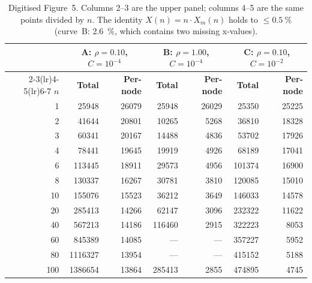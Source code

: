 \documentclass[11pt,a4paper]{article}
\newcommand{\hot}{C}
\newcommand{\tput}{\ensuremath{X}}
\newcommand{\pernode}{X_m}
\begin{document}
\begin{table}[H]
\centering
\caption{Digitised Figure~5. Columns 2--3 are the upper panel; columns 4--5 are
the same points divided by $n$. The identity $\tput(n) = n\cdot\pernode(n)$
holds to $\le\SI{0.5}{\percent}$ (curve~B: \SI{2.6}{\percent}, which contains
two missing x-values).}
\label{tab:fig5}
\begin{tabular}{@{}rrrrrrr@{}}
\toprule
& \multicolumn{2}{c}{\textbf{A: $\rho{=}0.10$, $\hot{=}10^{-4}$}}
& \multicolumn{2}{c}{\textbf{B: $\rho{=}1.00$, $\hot{=}10^{-4}$}}
& \multicolumn{2}{c}{\textbf{C: $\rho{=}0.10$, $\hot{=}10^{-2}$}} \\
\cmidrule(lr){2-3}\cmidrule(lr){4-5}\cmidrule(lr){6-7}
\textbf{$n$} & \textbf{Total} & \textbf{Per-node} & \textbf{Total} &
\textbf{Per-node} & \textbf{Total} & \textbf{Per-node} \\
\midrule
  1 & \num{25948} & \num{26079} & \num{25948} & \num{26029} & \num{25350} & \num{25225} \\
  2 & \num{41644} & \num{20801} & \num{10265} & \num{5268}  & \num{36810} & \num{18328} \\
  3 & \num{60341} & \num{20167} & \num{14488} & \num{4836}  & \num{53702} & \num{17926} \\
  4 & \num{78441} & \num{19645} & \num{19919} & \num{4926}  & \num{68189} & \num{17041} \\
  6 & \num{113445} & \num{18911} & \num{29573} & \num{4956} & \num{101374} & \num{16900} \\
  8 & \num{130337} & \num{16267} & \num{30781} & \num{3810}  & \num{120085} & \num{15010} \\
 10 & \num{155076} & \num{15523} & \num{36212} & \num{3649}  & \num{146033} & \num{14578} \\
 20 & \num{285413} & \num{14266} & \num{62147} & \num{3096}  & \num{232322} & \num{11622} \\
 40 & \num{567213} & \num{14186} & \num{116460} & \num{2915} & \num{322223} & \num{8053} \\
 60 & \num{845389} & \num{14085} & --- & --- & \num{357227} & \num{5952} \\
 80 & \num{1116327} & \num{13954} & --- & --- & \num{415152} & \num{5188} \\
 \midrule
100 & \num{1386654} & \num{13864} & \num{285413} & \num{2855} & \num{474895} & \num{4745} \\
\bottomrule
\end{tabular}
\end{table}
\end{document}
